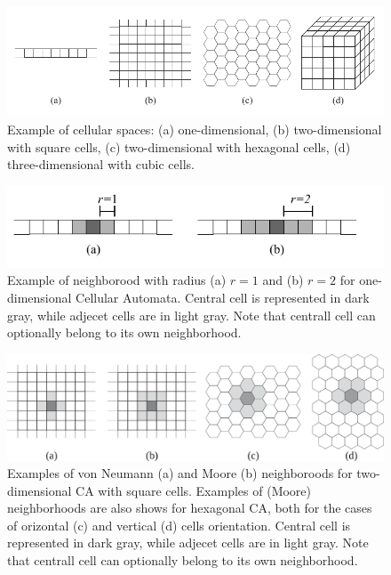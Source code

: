 \begin{figure}
  \begin{center}
    \includegraphics[width=12cm]{./images/CellularAutomata/cellularspaces}
    \caption{Example of cellular spaces: (a) one-dimensional, (b)
      two-dimensional with square cells, (c) two-dimensional with
      hexagonal cells, (d) three-dimensional with cubic cells.}
    \label{fig:cellularspaces}
  \end{center}
\end{figure}

\begin{figure}
  \begin{center}
    \includegraphics[width=12cm]{./images/CellularAutomata/onedimensional.pdf}
    \caption{Example of neighborood with radius (a) $r = 1$ and (b) $r
      = 2$ for one-dimensional Cellular Automata. Central cell is
      represented in dark gray, while adjecet cells are in light
      gray. Note that centrall cell can optionally belong to its own
      neighborhood.}
    \label{fig:1Dneighborhood}
  \end{center}
\end{figure}

\begin{figure}
  \begin{center}
    \includegraphics[width=12cm]{./images/CellularAutomata/2Dneighborhoods.png}
    \caption{Examples of von Neumann (a) and Moore (b) neighboroods
      for two-dimensional CA with square cells. Examples of (Moore)
      neighborhoods are also shows for hexagonal CA, both for the
      cases of orizontal (c) and vertical (d) cells
      orientation. Central cell is represented in dark gray, while
      adjecet cells are in light gray. Note that centrall cell can
      optionally belong to its own neighborhood.}
    \label{fig:2Dneighborhood}
  \end{center}
\end{figure}



